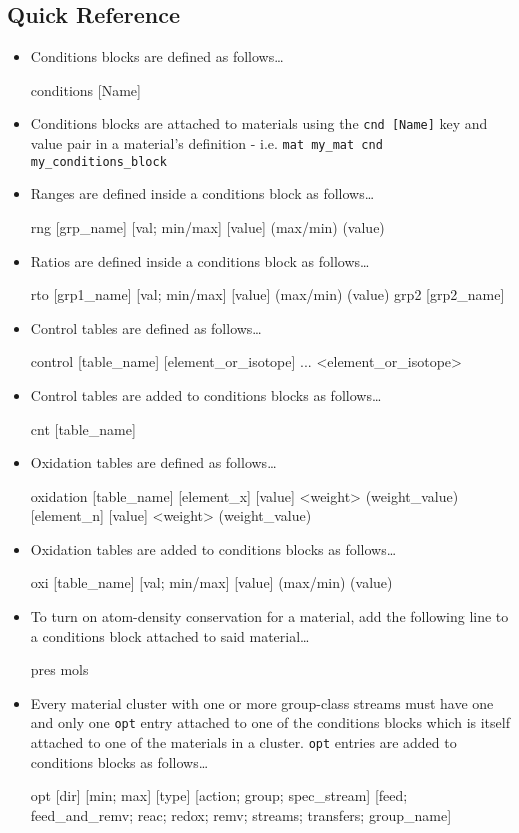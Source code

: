 \subsection{Quick Reference}\label{ssec:conditions_blocks_qr}
\begin{itemize}
\item{Conditions blocks are defined as follows\ldots
\begin{lt}
conditions [Name]
\end{lt}
    }
\item{Conditions blocks are attached to materials using the \texttt{cnd [Name]}
key and value pair in a material's definition - i.e. 
\texttt{mat my\_mat cnd my\_conditions\_block}
    }
\item{Ranges are defined inside a conditions block as follows\ldots
\begin{lt}
rng [grp_name] [{val; min/max}] [value] (max/min) (value)
\end{lt}
    }
\item{Ratios are defined inside a conditions block as follows\ldots
\begin{lt}
rto [grp1_name] [{val; min/max}] [value] (max/min) (value) 
    grp2 [grp2_name]
\end{lt}
    }
\item{Control tables are defined as follows\ldots
\begin{lt}
control [table_name]
[element_or_isotope]
...
<element_or_isotope>
\end{lt}
    }
\item{Control tables are added to conditions blocks as follows\ldots
\begin{lt}
cnt [table_name]
\end{lt}
    }
\item{Oxidation tables are defined as follows\ldots
\begin{lt}
oxidation [table_name]
[element_x] [value] <weight> (weight_value)
[element_n] [value] <weight> (weight_value)
\end{lt}
    }
\item{Oxidation tables are added to conditions blocks as follows\ldots
\begin{lt}
oxi [table_name] [{val; min/max}] [value] (max/min) (value)
\end{lt}
    }
\item{To turn on atom-density conservation for a material, add the following
line to a conditions block attached to said material\ldots
\begin{lt}
pres mols
\end{lt}
    }
\item{Every material cluster with one or more group-class streams must have
one and only one \texttt{opt} entry attached to one of the conditions blocks
which is itself attached to one of the materials in a cluster. \texttt{opt}
entries are added to conditions blocks as follows\ldots
\begin{lt}
opt [dir] [{min; max}] [type] [{action; group; spec_stream}]
    [{feed; feed_and_remv; reac; redox; remv; streams; 
        transfers; group_name}]
\end{lt}
    }
\end{itemize}
